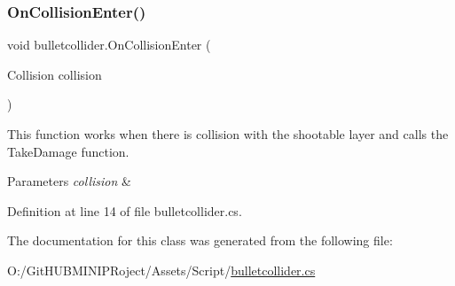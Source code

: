 \subsubsection{\texorpdfstring{OnCollisionEnter()}{OnCollisionEnter()}}
{\footnotesize\ttfamily void bulletcollider.\+On\+Collision\+Enter (\begin{DoxyParamCaption}\item[{Collision}]{collision }\end{DoxyParamCaption})}



This function works when there is collision with the shootable layer and calls the Take\+Damage function. 


\begin{DoxyParams}{Parameters}
{\em collision} & \\
\hline
\end{DoxyParams}


Definition at line 14 of file bulletcollider.\+cs.



The documentation for this class was generated from the following file\+:\begin{DoxyCompactItemize}
\item 
O\+:/\+Git\+H\+U\+B\+M\+I\+N\+I\+P\+Roject/\+Assets/\+Script/\mbox{\hyperlink{bulletcollider_8cs}{bulletcollider.\+cs}}\end{DoxyCompactItemize}
